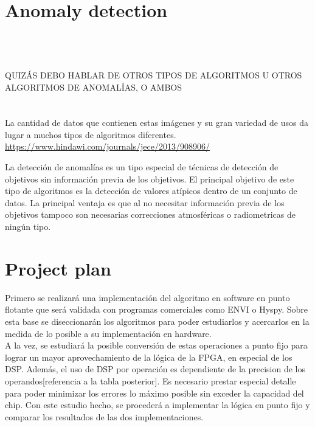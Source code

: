 \section{Anomaly detection}
\\
\\
\\
QUIZÁS DEBO HABLAR DE OTROS TIPOS DE ALGORITMOS U OTROS ALGORITMOS DE ANOMALÍAS, O AMBOS
\\
\\
\\

La cantidad de datos que contienen estas imágenes y su gran variedad de usos da lugar a muchos tipos de algoritmos diferentes.
\\
\url{https://www.hindawi.com/journals/jece/2013/908906/}

La detección de anomalías es un tipo especial de técnicas de detección de objetivos sin información previa de los objetivos. El principal objetivo de este tipo de algoritmos es la detección de valores atípicos dentro de un conjunto de datos. La principal ventaja es que al no necesitar información previa de los objetivos tampoco son necesarias correcciones atmosféricas o radiometricas de ningún tipo.


\section{Project plan}
Primero se realizará una implementación del algoritmo en software en punto flotante que será validada con programas comerciales como ENVI o Hyspy. Sobre esta base se diseccionarán los algoritmos para poder estudiarlos y acercarlos en la medida de lo posible a su implementación en hardware.
\\
A la vez, se estudiará la posible conversión de estas operaciones a punto fijo para lograr un mayor aprovechamiento de la lógica de la FPGA, en especial de los DSP. Además, el uso de DSP por operación es dependiente de la precision de los operandos[referencia a la tabla posterior]. Es necesario prestar especial detalle para poder minimizar los errores lo máximo posible sin exceder la capacidad del chip. Con este estudio hecho, se procederá a implementar la lógica en punto fijo y comparar los resultados de las dos implementaciones.


